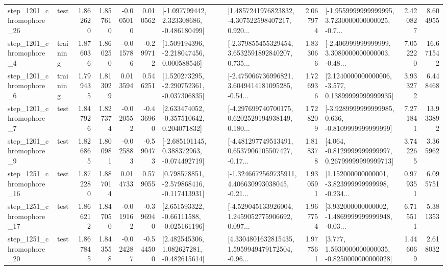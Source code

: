 \begin{tabular}{llrrrrllrlrr}
 step\_1201\_chromophore\_26 &      test &      1.862620 &    1.857610 &     -0.005010 &  0.010562 &   [-1.097799442, 2.323308686, -0.486180499] &  [1.4857241976823832, -4.307522598407217, 0.920... &       2.067974 &  [-1.9559999999999995, 3.7230000000000025, -0.7... &            2.420827 &          8.604955 \\
  step\_1201\_chromophore\_4 &  training &      1.876036 &    1.860250 &     -0.015786 & -0.299712 &    [1.509194396, -2.218047456, 0.000588546] &  [-2.379855455329454, 3.6532591892840207, 0.735... &       1.833066 &  [-2.406999999999999, 3.3080000000000003, -0.48... &            7.052220 &         16.671542 \\
  step\_1201\_chromophore\_6 &  training &      1.799435 &    1.813029 &      0.013594 &  0.546251 &   [1.520273295, -2.290752361, -0.037306835] &  [-2.475066736996821, 3.6049414181095285, -0.54... &       1.726936 &  [2.1240000000000006, -3.577, 0.13899999999999935] &            3.933272 &          6.448468 \\
  step\_1201\_chromophore\_7 &      test &      1.847926 &    1.827374 &     -0.020552 & -0.436960 &    [2.633474052, -0.357510642, 0.204071832] &  [-4.297699740700175, 0.6202529194938149, 0.180... &       1.728209 &  [-3.9289999999999985, 0.636, -0.8109999999999999] &            7.271841 &         13.933892 \\
  step\_1201\_chromophore\_9 &      test &      1.826865 &    1.800981 &     -0.025883 & -0.590473 &   [-2.685101145, 0.388372963, -0.074492719] &  [-4.481297749513491, 0.6537906105507427, -0.17... &       1.818378 &  [4.064, -0.8129999999999997, 0.26799999999999713] &            3.742265 &          3.365962 \\
 step\_1251\_chromophore\_16 &      test &      1.872280 &    1.887014 &      0.014733 &  0.579055 &   [0.798578851, -2.579868416, -0.117413931] &  [-1.3246672569735911, 4.406630993038045, -0.21... &       1.930591 &  [1.152000000000001, -3.823999999999998, -0.234... &            0.979351 &          6.095751 \\
 step\_1251\_chromophore\_17 &      test &      1.866212 &    1.847050 &     -0.019162 & -0.396940 &    [2.651593322, -0.66111588, -0.025161196] &  [-4.529045133926004, 1.2459052775906692, 0.097... &       1.967754 &  [3.932000000000002, -1.4869999999999948, -0.03... &            6.715511 &          5.381353 \\
 step\_1251\_chromophore\_20 &      test &      1.867845 &    1.843558 &     -0.024287 & -0.544500 &    [2.482545306, 1.082627281, -0.482615614] &  [4.3304801632815435, 1.5959949479172504, -0.96... &       1.977561 &   [3.777, 1.5930000000000035, -0.8250000000000028] &            1.446069 &          2.618032 \\

\end{tabular}
